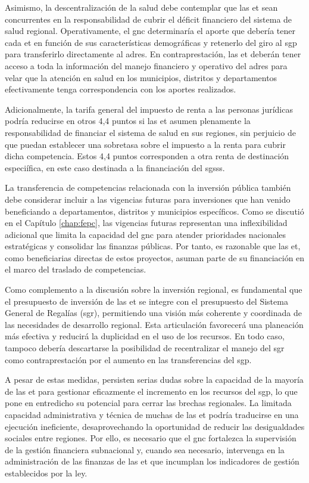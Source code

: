 Asimismo, la descentralización de la salud debe contemplar que las \gls{et} sean concurrentes en la responsabilidad de cubrir el déficit financiero del sistema de salud regional. Operativamente, el \gls{gnc} determinaría el aporte que debería tener cada \gls{et} en función de sus características demográficas y retenerlo del giro al \gls{sgp} para transferirlo directamente al \gls{adres}. En contraprestación, las \gls{et} deberán tener acceso a toda la información del manejo financiero y operativo del \gls{adres} para velar que la atención en salud en los municipios, distritos y departamentos efectivamente tenga correspondencia con los aportes realizados. 

Adicionalmente, la tarifa general del impuesto de renta a las personas jurídicas podría reducirse en otros 4,4 puntos si las \gls{et} asumen plenamente la responsabilidad de financiar el sistema de salud en sus regiones, sin perjuicio de que puedan establecer una sobretasa sobre el impuesto a la renta para cubrir dicha competencia. Estos 4,4 puntos corresponden a otra renta de destinación especiífica, en este caso destinada a la financiación del \gls{sgsss}.

La transferencia de competencias relacionada con la inversión pública también debe considerar incluir a las vigencias futuras para inversiones que han venido beneficiando a departamentos, distritos y municipios específicos. Como se discutió en el Capítulo \ref{chap:fepc}, las vigencias futuras representan una inflexibilidad adicional que limita la capacidad del \gls{gnc} para atender prioridades nacionales estratégicas y consolidar las finanzas públicas. Por tanto, es razonable que las \gls{et}, como beneficiarias directas de estos proyectos, asuman parte de su financiación en el marco del traslado de competencias.

Como complemento a la discusión sobre la inversión regional, es fundamental que el presupuesto de inversión de las \gls{et} se integre con el presupuesto del Sistema General de Regalías (\gls{sgr}), permitiendo una visión más coherente y coordinada de las necesidades de desarrollo regional. Esta articulación favorecerá una planeación más efectiva y reducirá la duplicidad en el uso de los recursos. En todo caso, tampoco debería descartarse la posibilidad de recentralizar el manejo del \gls{sgr} como contraprestación por el aumento en las transferencias del \gls{sgp}.

A pesar de estas medidas, persisten serias dudas sobre la capacidad de la mayoría de las \gls{et} para gestionar eficazmente el incremento en los recursos del \gls{sgp}, lo que pone en entredicho su potencial para cerrar las brechas regionales. La limitada capacidad administrativa y técnica de muchas de las \gls{et} podría traducirse en una ejecución ineficiente, desaprovechando la oportunidad de reducir las desigualdades sociales entre regiones. Por ello, es necesario que el \gls{gnc} fortalezca la supervisión de la gestión financiera subnacional y, cuando sea necesario, intervenga en la administración de las finanzas de las \gls{et} que incumplan los indicadores de gestión establecidos por la ley.

